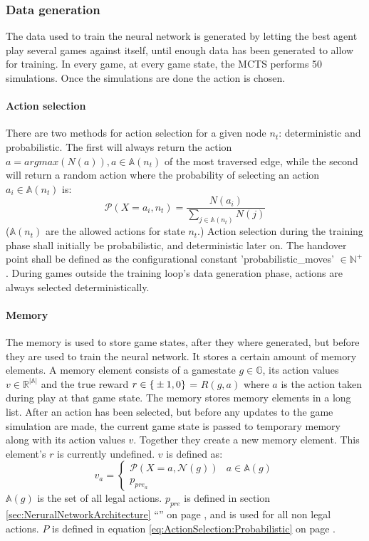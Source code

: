 \documentclass[12pt]{article}
\newcommand{\equationref}[1]{equation \ref{#1} on page \pageref{#1}}
\newcommand{\sectionref}[1]{section \ref{#1} ``\nameref{#1}'' on page \pageref{#1}}
\begin{document}
\subsubsection{Data generation}
The data used to train the neural network is generated by letting the best agent play several games against itself, until enough data has been generated to allow for training. In every game, at every game state, the MCTS performs 50 simulations. Once the simulations are done the action is chosen.
\paragraph{Action selection}\label{sec:training:actionSelection}
There are two methods for action selection for a given node \(n_t\): deterministic and probabilistic. The first will always return the action \(a = argmax(N(a)), a\in\mathbb A(n_t)\) of the most traversed edge, while the second will return a random action where the probability of selecting an action \(a_i \in \mathbb A(n_t)\) is:
\begin{equation} \label{eq:ActionSelection:Probabilistic}
\mathcal P(X=a_i, n_t) = \frac{N(a_i)}{\sum_{j \in \mathbb A(n_t)} N(j)}
\end{equation}
(\(\mathbb A(n_t)\) are the allowed actions for state \(n_t\).) Action selection during the training phase shall initially be probabilistic, and deterministic later on. The handover point shall be defined as the configurational constant 'probabilistic\_moves' \(\in \mathbb N^+\). During games outside the training loop's data generation phase, actions are always selected deterministically.
 \paragraph{Memory}
\label{sec:memory}
The memory is used to store game states, after they where generated, but before they are used to train the neural network.
It stores a certain amount of memory elements. A memory element consists of a gamestate \(g \in \mathbb G\), its action values \(v \in \mathbb R^{|\mathbb A|}\) and the true reward \(r \in \mathbb \{\pm1, 0\}\) = \(R(g, a)\) where \(a\) is the action taken during play at that game state. The memory stores memory elements in a long list. After an action has been selected, but before any updates to the game simulation are made, the current game state is passed to temporary memory along with its action values \(v\). Together they create a new memory element. This element's \(r\) is currently undefined. \(v\) is defined as: 
\begin{equation} \label{eq:Memory:ActionValuesDefinition}
v_a = 
\begin{cases}
\mathcal P(X=a, \mathcal N(g)) & a \in \mathbb A(g)\\
p_{pre_a} &
\end{cases}
\end{equation}
\(\mathbb A(g)\) is the set of all legal actions. \(p_{pre}\) is defined in \sectionref{sec:NeruralNetworkArchitecture}, and is used for all non legal actions. \(P\) is defined in \equationref{eq:ActionSelection:Probabilistic}.
\end{document}
